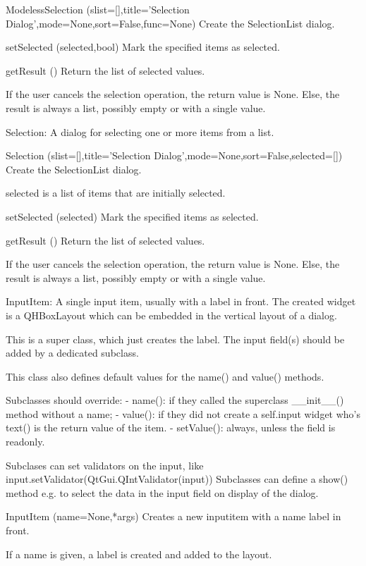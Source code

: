 ModelessSelection (slist=[],title='Selection Dialog',mode=None,sort=False,func=None)
Create the SelectionList dialog.
        

setSelected (selected,bool)
Mark the specified items as selected.

getResult ()
Return the list of selected values.

        If the user cancels the selection operation, the return value is None.
        Else, the result is always a list, possibly empty or with a single
        value.
        

Selection: A dialog for selecting one or more items from a list.

Selection (slist=[],title='Selection Dialog',mode=None,sort=False,selected=[])
Create the SelectionList dialog.

        selected is a list of items that are initially selected.
        

setSelected (selected)
Mark the specified items as selected.

getResult ()
Return the list of selected values.

        If the user cancels the selection operation, the return value is None.
        Else, the result is always a list, possibly empty or with a single
        value.
        

InputItem: A single input item, usually with a label in front.
    The created widget is a QHBoxLayout which can be embedded in the vertical
    layout of a dialog.
    
    This is a super class, which just creates the label. The input
    field(s) should be added by a dedicated subclass.

    This class also defines default values for the name() and value()
    methods.

    Subclasses should override:
    - name(): if they called the superclass __init__() method without a name;
    - value(): if they did not create a self.input widget who's text() is
      the return value of the item.
    - setValue(): always, unless the field is readonly.

    Subclases can set validators on the input, like
      input.setValidator(QtGui.QIntValidator(input))
    Subclasses can define a show() method e.g. to select the data in the
    input field on display of the dialog.
    
InputItem (name=None,*args)
Creates a new inputitem with a name label in front.
        
        If a name is given, a label is created and added to the layout.
        

